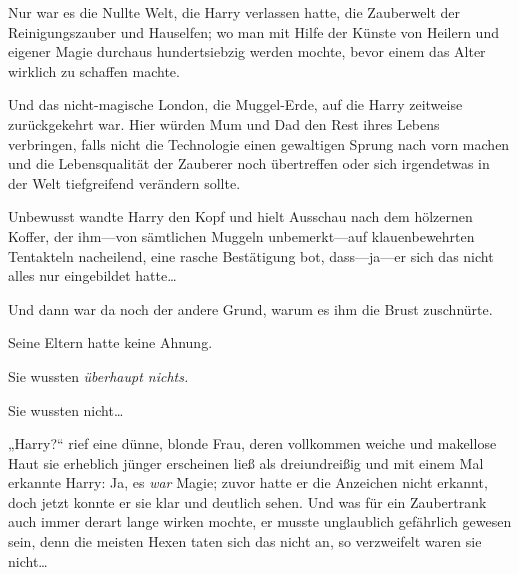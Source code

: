 Nur war es die Nullte Welt, die Harry verlassen hatte, die Zauberwelt der Reinigungszauber und Hauselfen; wo man mit Hilfe der Künste von Heilern und eigener Magie durchaus hundertsiebzig werden mochte, bevor einem das Alter wirklich zu schaffen machte.

Und das nicht-magische London, die Muggel-Erde, auf die Harry zeitweise zurückgekehrt war. Hier würden Mum und Dad den Rest ihres Lebens verbringen, falls nicht die Technologie einen gewaltigen Sprung nach vorn machen und die Lebensqualität der Zauberer noch übertreffen oder sich irgendetwas in der Welt tiefgreifend verändern sollte.

Unbewusst wandte Harry den Kopf und hielt Ausschau nach dem hölzernen Koffer, der ihm—von sämtlichen Muggeln unbemerkt—auf klauenbewehrten Tentakteln nacheilend, eine rasche Bestätigung bot, dass—ja—er sich das nicht alles nur eingebildet hatte…

Und dann war da noch der andere Grund, warum es ihm die Brust zuschnürte.

Seine Eltern hatte keine Ahnung.

Sie wussten \emph{überhaupt nichts.}

Sie wussten nicht…

„Harry?“ rief eine dünne, blonde Frau, deren vollkommen weiche und makellose Haut sie erheblich jünger erscheinen ließ als dreiundreißig und mit einem Mal erkannte Harry: Ja, es \emph{war} Magie; zuvor hatte er die Anzeichen nicht erkannt, doch jetzt konnte er sie klar und deutlich sehen. Und was für ein Zaubertrank auch immer derart lange wirken mochte, er musste unglaublich gefährlich gewesen sein, denn die meisten Hexen taten sich das nicht an, so verzweifelt waren sie nicht…

